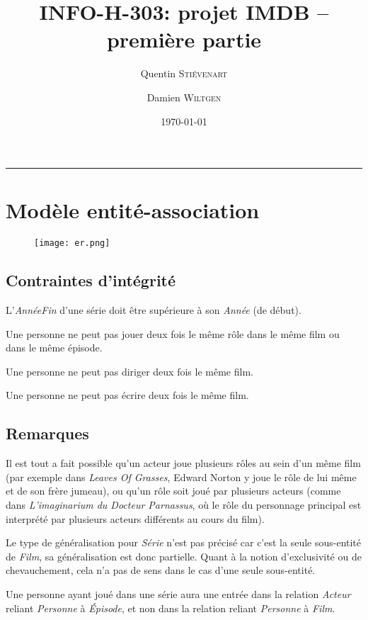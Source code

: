 \documentclass[a4paper,12pt]{article}
\title{INFO-H-303: projet IMDB -- première partie}
\author{Quentin \textsc{Stiévenart} \and Damien \textsc{Wiltgen}}
\date{\today}
\newcommand{\HRule}{\rule{\linewidth}{0.5mm}}
\begin{document}
\maketitle

\HRule

\section{Modèle entité-association}
\begin{figure}[ht!]
  \centering
  \texttt{[image: er.png]}
\end{figure}

\subsection{Contraintes d'intégrité}
\begin{list}{-}{}
  \item L'\emph{AnnéeFin} d'une série doit être supérieure à son \emph{Année} (de début).
  \item Une personne ne peut pas jouer deux fois le même rôle dans le même film ou dans le même épisode.
  \item Une personne ne peut pas diriger deux fois le même film.
  \item Une personne ne peut pas écrire deux fois le même film.
\end{list}
\subsection{Remarques}
\begin{list}{-}{}
  \item Il est tout a fait possible qu'un acteur joue plusieurs rôles au sein d'un même film (par exemple dans \emph{Leaves Of Grasses}, Edward Norton y joue le rôle de lui même et de son frère jumeau), ou qu'un rôle soit joué par plusieurs acteurs (comme dans \emph{L'imaginarium du Docteur Parnassus}, où le rôle du personnage principal est interprété par plusieurs acteurs différents au cours du film).
  \item Le type de généralisation pour \emph{Série} n'est pas précisé car c'est la seule sous-entité de \emph{Film}, sa généralisation est donc partielle. Quant à la notion d'exclusivité ou de chevauchement, cela n'a pas de sens dans le cas d'une seule sous-entité.
  \item Une personne ayant joué dans une série aura une entrée dans la relation \emph{Acteur} reliant \emph{Personne} à \emph{Épisode}, et non dans la relation reliant \emph{Personne} à \emph{Film}.
\end{list}
\end{document}

